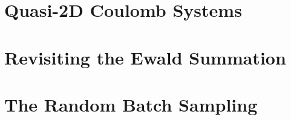 \section{Quasi-2D Coulomb Systems}

\section{Revisiting the Ewald Summation}

\section{The Random Batch Sampling}
